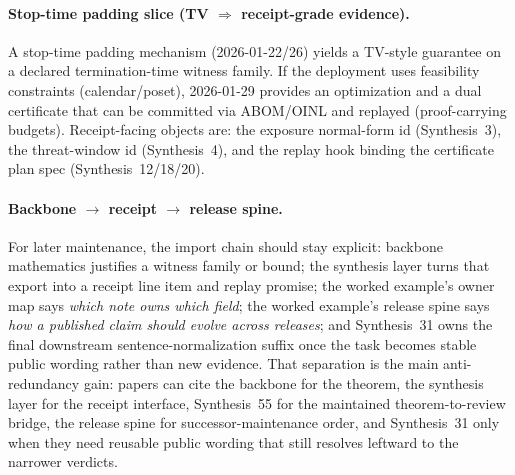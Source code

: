 \documentclass[11pt]{article}
\begin{document}
\paragraph{Stop-time padding slice (TV $\Rightarrow$ receipt-grade evidence).}
A stop-time padding mechanism (2026-01-22/26) yields a TV-style guarantee on a declared termination-time witness family.
If the deployment uses feasibility constraints (calendar/poset), 2026-01-29 provides an optimization and a dual certificate that can be committed via ABOM/OINL and replayed (proof-carrying budgets).
Receipt-facing objects are: the exposure normal-form id (Synthesis~3), the threat-window id (Synthesis~4), and the replay hook binding the certificate plan spec (Synthesis~12/18/20).\cite{series:traceifaces,series:threatwindows,series:receiptitems,series:planstateequiv,series:auditorreplay,wiki:scheduling,wiki:stopadd,wiki:knapsack}

\paragraph{Backbone $\to$ receipt $\to$ release spine.}
For later maintenance, the import chain should stay explicit: backbone mathematics justifies a witness family or bound; the synthesis layer turns that export into a receipt line item and replay promise; the worked example's owner map says \emph{which note owns which field}; the worked example's release spine says \emph{how a published claim should evolve across releases}; and Synthesis~31 owns the final downstream sentence-normalization suffix once the task becomes stable public wording rather than new evidence. That separation is the main anti-redundancy gain: papers can cite the backbone for the theorem, the synthesis layer for the receipt interface, Synthesis~55 for the maintained theorem-to-review bridge, the release spine for successor-maintenance order, and Synthesis~31 only when they need reusable public wording that still resolves leftward to the narrower verdicts.\cite{series:receiptitems,series:planstateequiv,series:workedexample,series:downstreamnormalforms,series:seriesspines}
\end{document}
